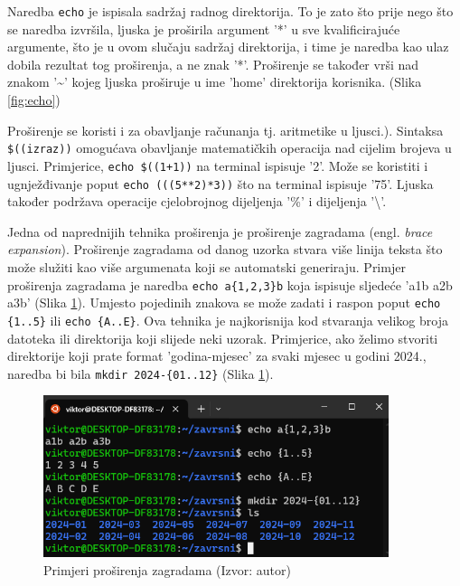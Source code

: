 \documentclass{foi}
\begin{document}
\begin{flushleft}
Naredba \verb|echo| je ispisala sadržaj radnog direktorija. To je zato što prije nego što se naredba izvršila, ljuska je proširila argument '*' u sve kvalificirajuće argumente, što je u ovom slučaju sadržaj direktorija, i time je naredba kao ulaz dobila rezultat tog proširenja, a ne znak '*'. Proširenje se također vrši nad znakom '\textasciitilde{}' kojeg ljuska proširuje u ime 'home' direktorija korisnika. (Slika \ref{fig:echo})
\end{flushleft}
\begin{flushleft}
Proširenje se koristi i za obavljanje računanja tj. aritmetike u ljusci.\cite{LinuxCommandExpansion}). Sintaksa \verb|$((izraz))| omogućava obavljanje matematičkih operacija nad cijelim brojeva u ljusci. Primjerice, \verb|echo $((1+1))| na terminal ispisuje '2'. Može se koristiti i ugnježđivanje poput \verb|echo (((5**2)*3))| što na terminal ispisuje '75'. Ljuska također podržava operacije cjelobrojnog dijeljenja '\%' i dijeljenja '\textbackslash{}'.
\end{flushleft}
\begin{flushleft}
Jedna od naprednijih tehnika proširenja je proširenje zagradama (engl. \textit{brace expansion}). Proširenje zagradama od danog uzorka stvara više linija teksta što može služiti kao više argumenata koji se automatski generiraju. Primjer proširenja zagradama je naredba \verb|echo a{1,2,3}b| koja ispisuje sljedeće 'a1b a2b a3b' (Slika \ref{fig:prosirenjezagradama}). Umjesto pojedinih znakova se može zadati i raspon poput \verb|echo {1..5}| ili \verb|echo {A..E}|. Ova tehnika je najkorisnija kod stvaranja velikog broja datoteka ili direktorija koji slijede neki uzorak. Primjerice, ako želimo stvoriti direktorije koji prate format 'godina-mjesec' za svaki mjesec u godini 2024., naredba bi bila \verb|mkdir 2024-{01..12}| (Slika \ref{fig:prosirenjezagradama}).
\end{flushleft}
\begin{figure}[H]
    \centering
    \includegraphics[width=0.9\textwidth]{slike/prosirenje.png}
    \caption{Primjeri proširenja zagradama (Izvor: autor)}
    \label{fig:prosirenjezagradama}
\end{figure}
\end{document}
